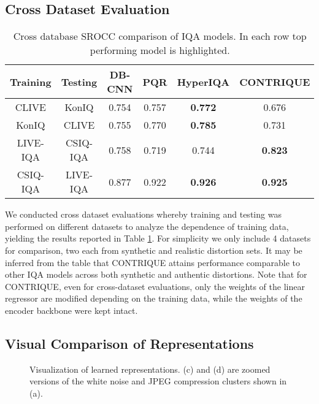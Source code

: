 \documentclass[journal]{IEEEtran}
\begin{document}
\subsection{Cross Dataset Evaluation}
\begin{table}[t]
\caption{Cross database SROCC comparison of IQA models. In each row top performing model is highlighted.}
\label{table:cross_data}
    \centering
    \scriptsize
        \begin{tabular}{|c|c||c|c|c|c|}
        \hline
        Training & Testing & DB-CNN & PQR & HyperIQA & CONTRIQUE \\ \hline
        CLIVE & KonIQ & 0.754 & 0.757 & \textbf{0.772} & 0.676 \\ 
        KonIQ & CLIVE & 0.755 & 0.770 & \textbf{0.785} & 0.731 \\ 
        LIVE-IQA & CSIQ-IQA & 0.758 & 0.719 & 0.744 & \textbf{0.823} \\ 
        CSIQ-IQA & LIVE-IQA & 0.877 & 0.922 & \textbf{0.926} & \textbf{0.925} \\
        \hline
    \end{tabular}
\end{table}

We conducted cross dataset evaluations whereby training and testing was performed on different datasets to analyze the dependence of training data, yielding the results reported in Table \ref{table:cross_data}. For simplicity we only include 4 datasets for comparison, two each from synthetic and realistic distortion sets. It may be inferred from the table that CONTRIQUE attains performance comparable to other IQA models across both synthetic and authentic distortions. Note that for CONTRIQUE, even for cross-dataset evaluations, only the weights of the linear regressor are modified depending on the training data, while the weights of the encoder backbone were kept intact.

\subsection{Visual Comparison of Representations}

\begin{figure}[t]
    \centering
     \quad
     \quad
     \quad
    \caption{Visualization of learned representations. (c) and (d) are zoomed versions of the white noise and JPEG compression clusters shown in (a).}
    \label{fig:comprison_representations}
\end{figure}
\end{document}
